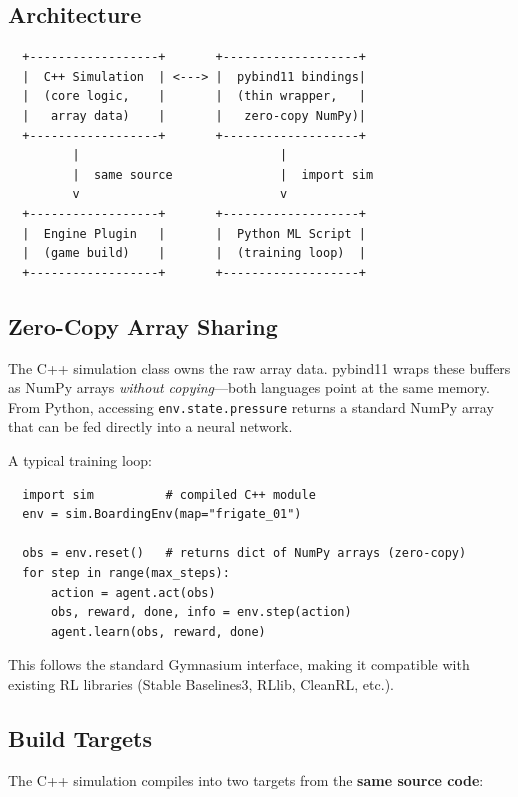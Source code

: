\documentclass[11pt,a4paper]{article}
\begin{document}
\subsection{Architecture}

\begin{verbatim}
  +------------------+       +-------------------+
  |  C++ Simulation  | <---> |  pybind11 bindings|
  |  (core logic,    |       |  (thin wrapper,   |
  |   array data)    |       |   zero-copy NumPy)|
  +------------------+       +-------------------+
         |                            |
         |  same source               |  import sim
         v                            v
  +------------------+       +-------------------+
  |  Engine Plugin   |       |  Python ML Script |
  |  (game build)    |       |  (training loop)  |
  +------------------+       +-------------------+
\end{verbatim}

\subsection{Zero-Copy Array Sharing}

The C++ simulation class owns the raw array data.  pybind11 wraps
these buffers as NumPy arrays \emph{without copying}---both languages
point at the same memory.  From Python, accessing
\texttt{env.state.pressure} returns a standard NumPy array that can be
fed directly into a neural network.

A typical training loop:

\begin{verbatim}
  import sim          # compiled C++ module
  env = sim.BoardingEnv(map="frigate_01")

  obs = env.reset()   # returns dict of NumPy arrays (zero-copy)
  for step in range(max_steps):
      action = agent.act(obs)
      obs, reward, done, info = env.step(action)
      agent.learn(obs, reward, done)
\end{verbatim}

This follows the standard Gymnasium interface, making it compatible with
existing RL libraries (Stable Baselines3, RLlib, CleanRL, etc.).

\subsection{Build Targets}

The C++ simulation compiles into two targets from the \textbf{same
source code}:
\end{document}
